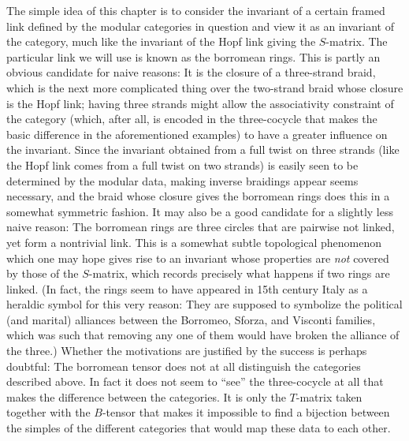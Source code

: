 \documentclass[11pt]{book}
\theoremstyle{Rem}
\theoremstyle{definition}
\numberwithin{equation}{section}
\begin{document}
The simple idea of this chapter is to consider the invariant of a certain framed link defined by the modular categories in question and view it as an invariant of the category, much like the invariant of the Hopf link giving the $S$-matrix. The particular link we will use is known as the borromean rings. This is partly an obvious candidate for naive reasons: It is the closure of a three-strand braid, which is the next more complicated thing over the two-strand braid whose closure is the Hopf link; having three strands might allow the associativity constraint of the category (which, after all, is encoded in the three-cocycle that makes the basic difference in the aforementioned examples)  to have a greater influence on the invariant. Since the invariant obtained from a full twist on three strands (like the Hopf link comes from a full twist on two strands) is easily seen to be determined by the modular data, making inverse braidings appear seems necessary, and the braid whose closure gives the borromean rings does this in a somewhat symmetric fashion. It may also be a good candidate for a slightly less naive reason: The borromean rings are three circles that are pairwise not linked, yet form a nontrivial link. This is a somewhat subtle topological phenomenon which one may hope gives rise to an invariant whose properties are \emph{not} covered by those of the $S$-matrix, which records precisely what happens if two rings are linked. (In fact, the rings seem to have appeared in 15th century Italy as a heraldic symbol for this very reason: They are supposed to symbolize the political (and marital) alliances between the Borromeo, Sforza, and Visconti families, which was such that removing any one of them would have broken the alliance of the three.) Whether the motivations are justified by the success is perhaps doubtful: The borromean tensor does not at all distinguish the categories described above. In fact it does not seem to ``see'' the three-cocycle at all that makes the difference between the categories. It is only the $T$-matrix taken together with the $B$-tensor that makes it impossible to find a bijection between the simples of the different categories that would map these data to each other.
\end{document}
